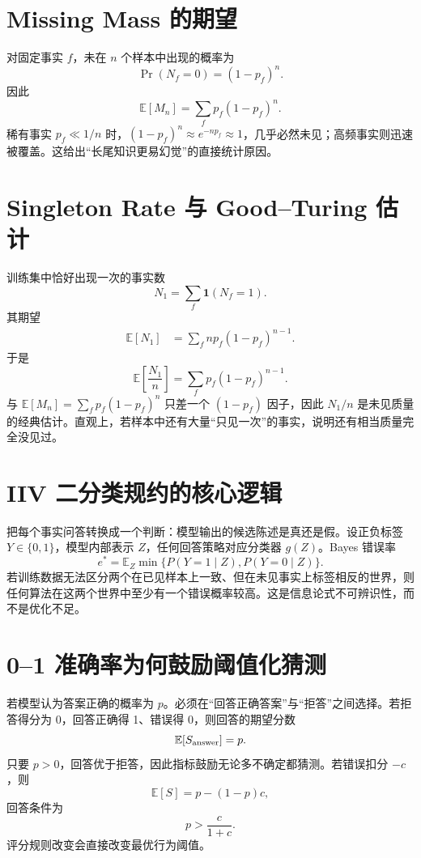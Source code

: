 \documentclass[UTF8,12pt,a4paper,fontset=none]{ctexart}
\numberwithin{equation}{section}
\newcommand{\E}{\mathbb{E}}
\begin{document}
\section{Missing Mass 的期望}
对固定事实 $f$，未在 $n$ 个样本中出现的概率为
\begin{equation}
 \Pr(N_f=0)=(1-p_f)^n.
\end{equation}
因此
\begin{equation}
 \E[M_n]=\sum_f p_f(1-p_f)^n.
\end{equation}
稀有事实 $p_f\ll1/n$ 时，$(1-p_f)^n\approx e^{-np_f}\approx1$，几乎必然未见；高频事实则迅速被覆盖。这给出“长尾知识更易幻觉”的直接统计原因。

\section{Singleton Rate 与 Good--Turing 估计}
训练集中恰好出现一次的事实数
\begin{equation}
 N_1=\sum_f\mathbf 1(N_f=1).
\end{equation}
其期望
\begin{align}
 \E[N_1]
 &=\sum_f n p_f(1-p_f)^{n-1}.
\end{align}
于是
\begin{equation}
 \E\left[\frac{N_1}{n}\right]
 =\sum_f p_f(1-p_f)^{n-1}.
\end{equation}
与 $\E[M_n]=\sum_fp_f(1-p_f)^n$ 只差一个 $(1-p_f)$ 因子，因此 $N_1/n$ 是未见质量的经典估计。直观上，若样本中还有大量“只见一次”的事实，说明还有相当质量完全没见过。

\section{IIV 二分类规约的核心逻辑}
把每个事实问答转换成一个判断：模型输出的候选陈述是真还是假。设正负标签 $Y\in\{0,1\}$，模型内部表示 $Z$，任何回答策略对应分类器 $g(Z)$。Bayes 错误率
\begin{equation}
 e^*=\E_Z\min\{P(Y=1\mid Z),P(Y=0\mid Z)\}.
\end{equation}
若训练数据无法区分两个在已见样本上一致、但在未见事实上标签相反的世界，则任何算法在这两个世界中至少有一个错误概率较高。这是信息论式不可辨识性，而不是优化不足。

\section{0--1 准确率为何鼓励阈值化猜测}
若模型认为答案正确的概率为 $p$。必须在“回答正确答案”与“拒答”之间选择。若拒答得分为 0，回答正确得 1、错误得 0，则回答的期望分数
\begin{equation}
 \E[S_{\rm answer}]=p.
\end{equation}
只要 $p>0$，回答优于拒答，因此指标鼓励无论多不确定都猜测。若错误扣分 $-c$，则
\begin{equation}
 \E[S]=p-(1-p)c,
\end{equation}
回答条件为
\begin{equation}
 p>\frac{c}{1+c}.
\end{equation}
评分规则改变会直接改变最优行为阈值。
\end{document}
